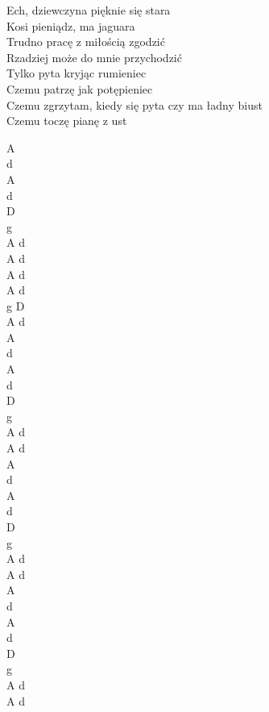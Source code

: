 \documentclass[a5paper, 10pt]{book}
\begin{document}
\begin{minipage}[t]{0.8\textwidth}
Ech, dziewczyna pięknie się stara\\
Kosi pieniądz, ma jaguara\\
Trudno pracę z miłością zgodzić\\
Rzadziej może do mnie przychodzić\\
Tylko pyta kryjąc rumieniec\\
Czemu patrzę jak potępieniec\\
Czemu zgrzytam, kiedy się pyta czy ma ładny biust\\
Czemu toczę pianę z ust\\
\end{minipage}
\begin{minipage}[t]{0.2\textwidth}
A\\
d\\
A\\
d\\
D\\
g\\
A d\\
A d\\

A d\\
A d\\
g D\\
A d\\

A\\
d\\
A\\
d\\
D\\
g\\
A d\\
A d\\

A\\
d\\
A\\
d\\
D\\
g\\
A d\\
A d\\

A\\
d\\
A\\
d\\
D\\
g\\
A d\\
A d\\

\end{minipage}
\end{document}
